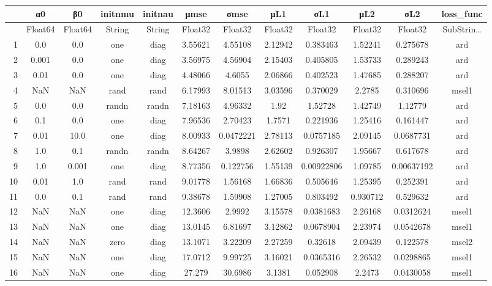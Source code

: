 \documentclass[12pt,a4paper]{article}
\begin{document}
\begin{tabular}{r|ccccccccccc}
	& α0 & β0 & initnmu & initnau & μmse & σmse & μL1 & σL1 & μL2 & σL2 & loss\_func\\
	\hline
	& Float64 & Float64 & String & String & Float32 & Float32 & Float32 & Float32 & Float32 & Float32 & SubStrin…\\
	\hline
	1 & 0.0 & 0.0 & one & diag & 3.55621 & 4.55108 & 2.12942 & 0.383463 & 1.52241 & 0.275678 & ard \\
	2 & 0.001 & 0.0 & one & diag & 3.56975 & 4.56904 & 2.15403 & 0.405805 & 1.53733 & 0.289243 & ard \\
	3 & 0.01 & 0.0 & one & diag & 4.48066 & 4.6055 & 2.06866 & 0.402523 & 1.47685 & 0.288207 & ard \\
	4 & NaN & NaN & rand & rand & 6.17993 & 8.01513 & 3.03596 & 0.370029 & 2.2785 & 0.310696 & msel1 \\
	5 & 0.0 & 0.0 & randn & randn & 7.18163 & 4.96332 & 1.92 & 1.52728 & 1.42749 & 1.12779 & ard \\
	6 & 0.1 & 0.0 & one & diag & 7.96536 & 2.70423 & 1.7571 & 0.221936 & 1.25416 & 0.161447 & ard \\
	7 & 0.01 & 10.0 & one & diag & 8.00933 & 0.0472221 & 2.78113 & 0.0757185 & 2.09145 & 0.0687731 & ard \\
	8 & 1.0 & 0.1 & randn & randn & 8.64267 & 3.9898 & 2.62602 & 0.926307 & 1.95667 & 0.617678 & ard \\
	9 & 1.0 & 0.001 & one & diag & 8.77356 & 0.122756 & 1.55139 & 0.00922806 & 1.09785 & 0.00637192 & ard \\
	10 & 0.01 & 1.0 & rand & rand & 9.01778 & 1.56168 & 1.66836 & 0.505646 & 1.25395 & 0.252391 & ard \\
	11 & 0.0 & 0.1 & rand & rand & 9.38678 & 1.59908 & 1.27005 & 0.803492 & 0.930712 & 0.529632 & ard \\
	12 & NaN & NaN & one & diag & 12.3606 & 2.9992 & 3.15578 & 0.0381683 & 2.26168 & 0.0312624 & msel1 \\
	13 & NaN & NaN & one & diag & 13.0145 & 6.81697 & 3.12862 & 0.0678904 & 2.23974 & 0.0542678 & msel1 \\
	14 & NaN & NaN & zero & diag & 13.1071 & 3.22209 & 2.27259 & 0.32618 & 2.09439 & 0.122578 & msel2 \\
	15 & NaN & NaN & one & diag & 17.0712 & 9.99725 & 3.16021 & 0.0365316 & 2.26532 & 0.0298865 & msel1 \\
	16 & NaN & NaN & one & diag & 27.279 & 30.6986 & 3.1381 & 0.052908 & 2.2473 & 0.0430058 & msel1 \\

\end{tabular}
\end{document}
